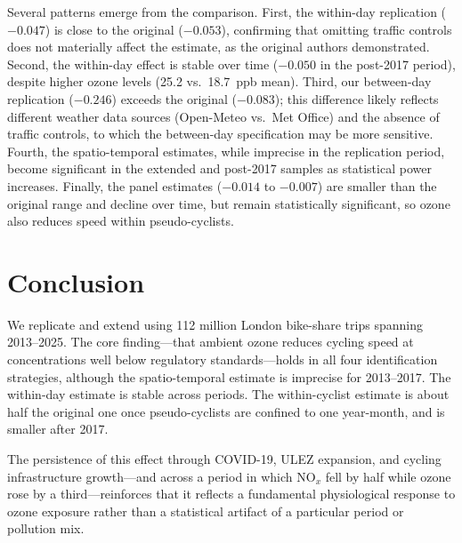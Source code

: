 \documentclass[12pt]{article}
\begin{document}
Several patterns emerge from the comparison. First, the within-day replication ($-0.047$) is close to the original ($-0.053$), confirming that omitting traffic controls does not materially affect the estimate, as the original authors demonstrated. Second, the within-day effect is stable over time ($-0.050$ in the post-2017 period), despite higher ozone levels (25.2 vs.\ 18.7~ppb mean). Third, our between-day replication ($-0.246$) exceeds the original ($-0.083$); this difference likely reflects different weather data sources (Open-Meteo vs.\ Met Office) and the absence of traffic controls, to which the between-day specification may be more sensitive. Fourth, the spatio-temporal estimates, while imprecise in the replication period, become significant in the extended and post-2017 samples as statistical power increases. Finally, the panel estimates ($-0.014$ to $-0.007$) are smaller than the original range and decline over time, but remain statistically significant, so ozone also reduces speed within pseudo-cyclists.

\section{Conclusion} \label{sec:conclusion}

We replicate and extend \citet{klingen2020urban} using 112 million London bike-share trips spanning 2013--2025. The core finding---that ambient ozone reduces cycling speed at concentrations well below regulatory standards---holds in all four identification strategies, although the spatio-temporal estimate is imprecise for 2013--2017. The within-day estimate is stable across periods. The within-cyclist estimate is about half the original one once pseudo-cyclists are confined to one year-month, and is smaller after 2017.

The persistence of this effect through COVID-19, ULEZ expansion, and cycling infrastructure growth---and across a period in which NO$_x$ fell by half while ozone rose by a third---reinforces that it reflects a fundamental physiological response to ozone exposure rather than a statistical artifact of a particular period or pollution mix.

\newpage

\end{document}
